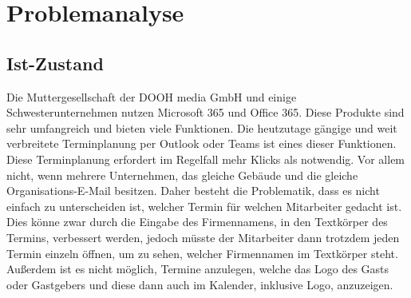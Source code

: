 


\section{Problemanalyse}\label{sec:problemanalyse}
\subsection{Ist-Zustand}\label{subsec:ist-zustand}
Die Muttergesellschaft der DOOH media GmbH und einige Schwesterunternehmen nutzen Microsoft 365 und Office 365.
Diese Produkte sind sehr umfangreich und bieten viele Funktionen.
Die heutzutage gängige und weit verbreitete Terminplanung per Outlook oder Teams ist eines dieser Funktionen.
Diese Terminplanung erfordert im Regelfall mehr Klicks als notwendig.
Vor allem nicht, wenn mehrere Unternehmen, das gleiche Gebäude und die gleiche Organisations-E-Mail besitzen.
Daher besteht die Problematik, dass es nicht einfach zu unterscheiden ist, welcher Termin für welchen Mitarbeiter gedacht ist.
Dies könne zwar durch die Eingabe des Firmennamens, in den Textkörper des Termins, verbessert werden, jedoch müsste der Mitarbeiter dann trotzdem jeden Termin einzeln öffnen, um zu sehen, welcher Firmennamen im Textkörper steht.
\newline
Außerdem ist es nicht möglich, Termine anzulegen, welche das Logo des Gasts oder Gastgebers und diese dann auch im Kalender, inklusive Logo, anzuzeigen.
